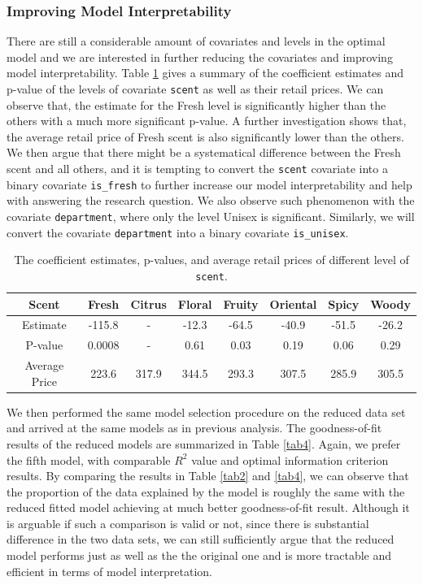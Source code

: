 \documentclass[12pt]{amsart}
\begin{document}
\subsubsection{Improving Model Interpretability} There are still a considerable amount of covariates and levels in the optimal model and we are interested in further reducing the covariates and improving model interpretability. Table \ref{tab3} gives a summary of the coefficient estimates and p-value of the levels of covariate \texttt{scent} as well as their retail prices. We can observe that, the estimate for the Fresh level is significantly higher than the others with a much more significant p-value. A further investigation shows that, the average retail price of Fresh scent is also significantly lower than the others. We then argue that there might be a systematical difference between the Fresh scent and all others, and it is tempting to convert the \texttt{scent} covariate into a binary covariate \texttt{is\_fresh} to further increase our model interpretability and help with answering the research question. We also observe such phenomenon with the covariate \texttt{department}, where only the level Unisex is significant. Similarly, we will convert the covariate \texttt{department} into a binary covariate \texttt{is\_unisex}. 
\begin{table}[H]
    \centering
    \renewcommand{\arraystretch}{1.2}
        \begin{tabular}{c c c c c c c c}
        \hline
            Scent &Fresh&Citrus&Floral&Fruity&Oriental&Spicy&Woody \\
            \hline
            Estimate &-115.8&-&-12.3&-64.5&-40.9&-51.5&-26.2\\
            P-value & 0.0008 & - & 0.61&0.03&0.19&0.06&0.29\\
            Average Price&223.6&317.9&344.5&293.3&307.5&285.9&305.5\\
             \hline
        \end{tabular}
 \vspace{10pt}
 \caption{The coefficient estimates, p-values, and average retail prices of different level of \texttt{scent}.}
\label{tab3}
\end{table}
We then performed the same model selection procedure on the reduced data set and arrived at the same models as in previous analysis. The goodness-of-fit results of the reduced models are summarized in Table \ref{tab4}. Again, we prefer the fifth model, with comparable $R^2$ value and optimal information criterion results. By comparing the results in Table \ref{tab2} and \ref{tab4}, we can observe that the proportion of the data explained by the model is roughly the same with the reduced fitted model achieving at much better goodness-of-fit result. Although it is arguable if such a comparison is valid or not, since there is substantial difference in the two data sets, we can still sufficiently argue that the reduced model performs just as well as the the original one and is more tractable and efficient in terms of model interpretation. 
\end{document}
